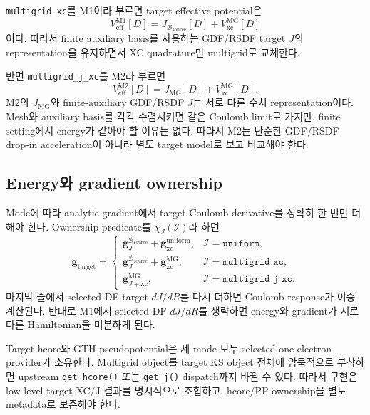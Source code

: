 \texttt{multigrid\_xc}를 M1이라 부르면 target effective potential은
\begin{equation}
  V_{\mathrm{eff}}^{\mathrm{M1}}[D]
  =J_{\mathcal B_{\mathrm{source}}}[D]
   +V_{\mathrm{xc}}^{\mathrm{MG}}[D]
  \label{eq:target-m1-veff}
\end{equation}
이다. 따라서 finite auxiliary basis를 사용하는 GDF/RSDF target $J$의 representation을
유지하면서 XC quadrature만 multigrid로 교체한다.

반면 \texttt{multigrid\_j\_xc}를 M2라 부르면
\begin{equation}
  V_{\mathrm{eff}}^{\mathrm{M2}}[D]
  =J_{\mathrm{MG}}[D]+V_{\mathrm{xc}}^{\mathrm{MG}}[D].
  \label{eq:target-m2-veff}
\end{equation}
M2의 $J_{\mathrm{MG}}$와 finite-auxiliary GDF/RSDF $J$는 서로 다른 수치
representation이다. Mesh와 auxiliary basis를 각각 수렴시키면 같은 Coulomb limit로
가지만, finite setting에서 energy가 같아야 할 이유는 없다. 따라서 M2는 단순한
GDF/RSDF drop-in acceleration이 아니라 별도 target model로 보고 비교해야 한다.

\subsection{Energy와 gradient ownership}

Mode에 따라 analytic gradient에서 target Coulomb derivative를 정확히 한 번만 더해야
한다. Ownership predicate를 $\chi_J(\mathcal I)$라 하면
\begin{equation}
  \mathbf g_{\mathrm{target}}
  =\begin{cases}
    \mathbf g_J^{\mathcal B_{\mathrm{source}}}
    +\mathbf g_{\mathrm{xc}}^{\mathrm{uniform}},
      &\mathcal I=\texttt{uniform},\\
    \mathbf g_J^{\mathcal B_{\mathrm{source}}}
    +\mathbf g_{\mathrm{xc}}^{\mathrm{MG}},
      &\mathcal I=\texttt{multigrid\_xc},\\
    \mathbf g_{J+\mathrm{xc}}^{\mathrm{MG}},
      &\mathcal I=\texttt{multigrid\_j\_xc}.
  \end{cases}
  \label{eq:target-gradient-owner}
\end{equation}
마지막 줄에서 selected-DF target $dJ/dR$를 다시 더하면 Coulomb response가 이중 계산된다.
반대로 M1에서 selected-DF $dJ/dR$를 생략하면 energy와 gradient가 서로 다른 Hamiltonian을
미분하게 된다.

Target hcore와 GTH pseudopotential은 세 mode 모두 selected one-electron provider가
소유한다. Multigrid object를 target KS object 전체에 암묵적으로 부착하면 upstream
\texttt{get\_hcore()} 또는 \texttt{get\_j()} dispatch까지 바뀔 수 있다. 따라서 구현은
low-level target XC/J 결과를 명시적으로 조합하고, hcore/PP ownership을 별도 metadata로
보존해야 한다.

